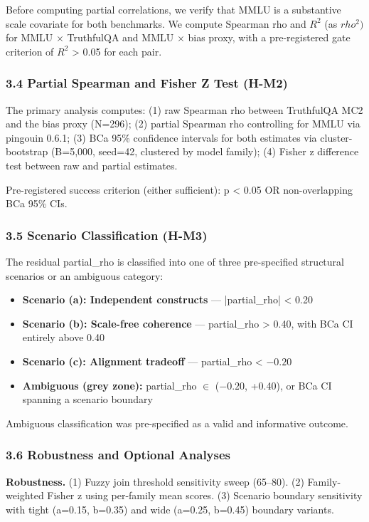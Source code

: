 Before computing partial correlations, we verify that MMLU is a substantive scale covariate for both benchmarks. We compute Spearman rho and $R^2$ (as $rho^{2})$ for MMLU $\times$ TruthfulQA and MMLU $\times$ bias proxy, with a pre-registered gate criterion of $R^2$ > 0.05 for each pair.

\subsubsection{3.4 Partial Spearman and Fisher Z Test (H-M2)}

The primary analysis computes: (1) raw Spearman rho between TruthfulQA MC2 and the bias proxy (N=296); (2) partial Spearman rho controlling for MMLU via pingouin 0.6.1; (3) BCa 95\% confidence intervals for both estimates via cluster-bootstrap (B=5,000, seed=42, clustered by model family); (4) Fisher z difference test between raw and partial estimates.

Pre-registered success criterion (either sufficient): p < 0.05 OR non-overlapping BCa 95\% CIs.

\subsubsection{3.5 Scenario Classification (H-M3)}

The residual partial\_rho is classified into one of three pre-specified structural scenarios or an ambiguous category:

\begin{itemize}
\item \textbf{Scenario (a): Independent constructs} --- |partial\_rho| < 0.20
\item \textbf{Scenario (b): Scale-free coherence} --- partial\_rho > 0.40, with BCa CI entirely above 0.40
\item \textbf{Scenario (c): Alignment tradeoff} --- partial\_rho < $-0.20$
\item \textbf{Ambiguous (grey zone):} partial\_rho $\in$ ($-0.20$, +0.40), or BCa CI spanning a scenario boundary
\end{itemize}

Ambiguous classification was pre-specified as a valid and informative outcome.

\subsubsection{3.6 Robustness and Optional Analyses}

\textbf{Robustness.} (1) Fuzzy join threshold sensitivity sweep (65--80). (2) Family-weighted Fisher z using per-family mean scores. (3) Scenario boundary sensitivity with tight (a=0.15, b=0.35) and wide (a=0.25, b=0.45) boundary variants.

